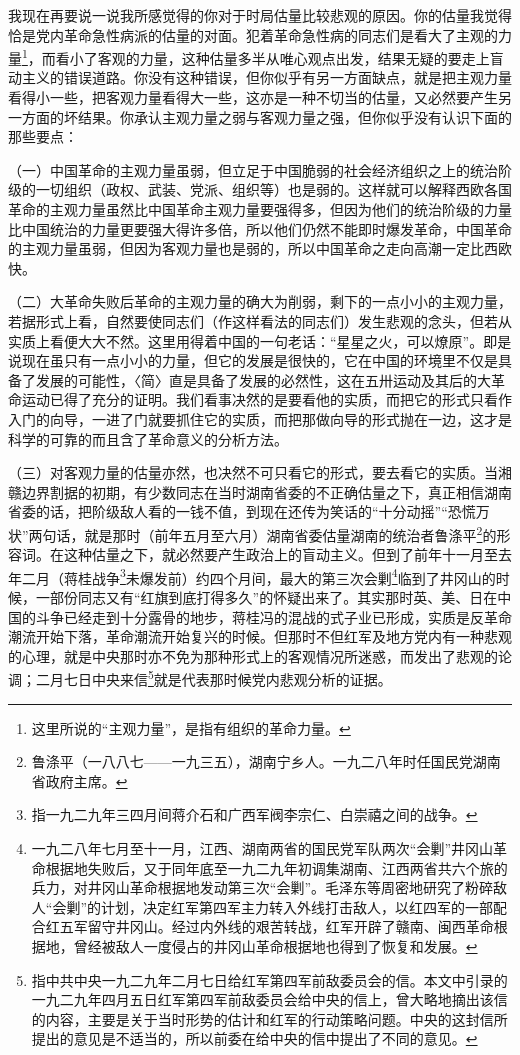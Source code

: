 \documentclass[UTF8, 12pt, a4paper]{ctexrep}
\begin{document}
我现在再要说一说我所感觉得的你对于时局估量比较悲观的原因。你的估量我觉得恰是党内革命急性病派的估量的对面。犯着革命急性病的同志们是看大了主观的力量\footnote{这里所说的“主观力量”，是指有组织的革命力量。}，而看小了客观的力量，这种估量多半从唯心观点出发，结果无疑的要走上盲动主义的错误道路。你没有这种错误，但你似乎有另一方面缺点，就是把主观力量看得小一些，把客观力量看得大一些，这亦是一种不切当的估量，又必然要产生另一方面的坏结果。你承认主观力量之弱与客观力量之强，但你似乎没有认识下面的那些要点：

（一）中国革命的主观力量虽弱，但立足于中国脆弱的社会经济组织之上的统治阶级的一切组织（政权、武装、党派、组织等）也是弱的。这样就可以解释西欧各国革命的主观力量虽然比中国革命主观力量要强得多，但因为他们的统治阶级的力量比中国统治的力量更要强大得许多倍，所以他们仍然不能即时爆发革命，中国革命的主观力量虽弱，但因为客观力量也是弱的，所以中国革命之走向高潮一定比西欧快。

（二）大革命失败后革命的主观力量的确大为削弱，剩下的一点小小的主观力量，若据形式上看，自然要使同志们（作这样看法的同志们）发生悲观的念头，但若从实质上看便大大不然。这里用得着中国的一句老话：“星星之火，可以燎原”。即是说现在虽只有一点小小的力量，但它的发展是很快的，它在中国的环境里不仅是具备了发展的可能性，〈简〉直是具备了发展的必然性，这在五卅运动及其后的大革命运动已得了充分的证明。我们看事决然的是要看他的实质，而把它的形式只看作入门的向导，一进了门就要抓住它的实质，而把那做向导的形式抛在一边，这才是科学的可靠的而且含了革命意义的分析方法。

（三）对客观力量的估量亦然，也决然不可只看它的形式，要去看它的实质。当湘赣边界割据的初期，有少数同志在当时湖南省委的不正确估量之下，真正相信湖南省委的话，把阶级敌人看的一钱不值，到现在还传为笑话的“十分动摇”“恐慌万状”两句话，就是那时（前年五月至六月）湖南省委估量湖南的统治者鲁涤平\footnote{鲁涤平（一八八七——一九三五），湖南宁乡人。一九二八年时任国民党湖南省政府主席。}的形容词。在这种估量之下，就必然要产生政治上的盲动主义。但到了前年十一月至去年二月（蒋桂战争\footnote{指一九二九年三四月间蒋介石和广西军阀李宗仁、白崇禧之间的战争。}未爆发前）约四个月间，最大的第三次会剿\footnote{一九二八年七月至十一月，江西、湖南两省的国民党军队两次“会剿”井冈山革命根据地失败后，又于同年底至一九二九年初调集湖南、江西两省共六个旅的兵力，对井冈山革命根据地发动第三次“会剿”。毛泽东等周密地研究了粉碎敌人“会剿”的计划，决定红军第四军主力转入外线打击敌人，以红四军的一部配合红五军留守井冈山。经过内外线的艰苦转战，红军开辟了赣南、闽西革命根据地，曾经被敌人一度侵占的井冈山革命根据地也得到了恢复和发展。}临到了井冈山的时候，一部份同志又有“红旗到底打得多久”的怀疑出来了。其实那时英、美、日在中国的斗争已经走到十分露骨的地步，蒋桂冯的混战的式子业已形成，实质是反革命潮流开始下落，革命潮流开始复兴的时候。但那时不但红军及地方党内有一种悲观的心理，就是中央那时亦不免为那种形式上的客观情况所迷惑，而发出了悲观的论调；二月七日中央来信\footnote{指中共中央一九二九年二月七日给红军第四军前敌委员会的信。本文中引录的一九二九年四月五日红军第四军前敌委员会给中央的信上，曾大略地摘出该信的内容，主要是关于当时形势的估计和红军的行动策略问题。中央的这封信所提出的意见是不适当的，所以前委在给中央的信中提出了不同的意见。}就是代表那时候党内悲观分析的证据。
\end{document}
